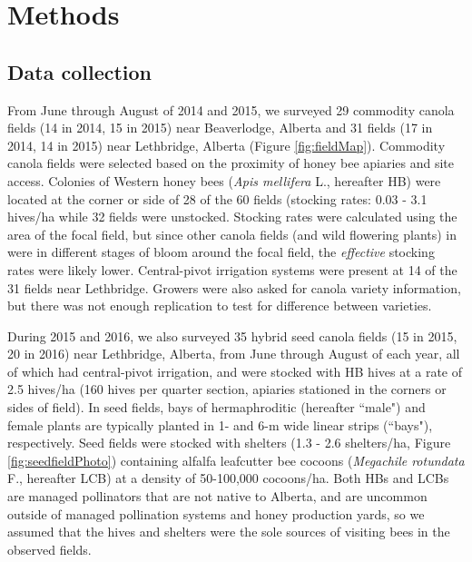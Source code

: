 \documentclass[12pt]{article} %
\begin{document}
\section*{Methods}

\subsection*{Data collection}
From June through August of 2014 and 2015, we surveyed 29 commodity canola fields (14 in 2014, 15 in 2015) near Beaverlodge, Alberta and 31 fields (17 in 2014, 14 in 2015) near Lethbridge, Alberta (Figure \ref{fig:fieldMap}).
Commodity canola fields were selected based on the proximity of honey bee apiaries and site access. 
Colonies of Western honey bees (\emph{Apis mellifera} L., hereafter HB) were located at the corner or side of 28 of the 60 fields (stocking rates: 0.03 - 3.1 hives/ha while 32 fields were unstocked. %
Stocking rates were calculated using the area of the focal field, but since other canola fields (and wild flowering plants) in were in different stages of bloom around the focal field, the \emph{effective} stocking rates were likely lower.
Central-pivot irrigation systems were present at 14 of the 31 fields near Lethbridge.
Growers were also asked for canola variety information, but there was not enough replication to test for difference between varieties.

During 2015 and 2016, we also surveyed 35 hybrid seed canola fields (15 in 2015, 20 in 2016) near Lethbridge, Alberta, from June through August of each year, all of which had central-pivot irrigation, and were stocked with HB hives at a rate of 2.5 hives/ha (160 hives per quarter section, apiaries stationed in the corners or sides of field).
In seed fields, bays of hermaphroditic (hereafter ``male") and female plants are typically planted in 1- and 6-m wide linear strips (``bays"), respectively. 
Seed fields were stocked with shelters (1.3 - 2.6 shelters/ha, Figure \ref{fig:seedfieldPhoto}) containing alfalfa leafcutter bee cocoons (\textit{Megachile rotundata} F., hereafter LCB) at a density of 50-100,000 cocoons/ha. 
Both HBs and LCBs are managed pollinators that are not native to Alberta, and are uncommon outside of managed pollination systems and honey production yards, so we assumed that the hives and shelters were the sole sources of visiting bees in the observed fields.
\end{document}

